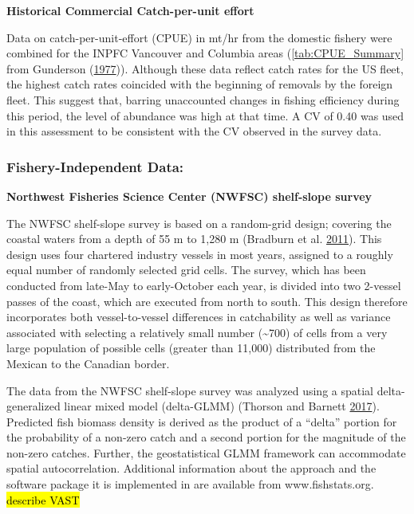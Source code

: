 \documentclass[12pt,]{article}
\begin{document}
\textbf{Historical Commercial Catch-per-unit effort}

Data on catch-per-unit-effort (CPUE) in mt/hr from the domestic fishery
were combined for the INPFC Vancouver and Columbia areas
(\ref{tab:CPUE_Summary} from Gunderson
(\protect\hyperlink{ref-gunderson_population_1977}{1977})). Although
these data reflect catch rates for the US fleet, the highest catch rates
coincided with the beginning of removals by the foreign fleet. This
suggest that, barring unaccounted changes in fishing efficiency during
this period, the level of abundance was high at that time. A CV of 0.40
was used in this assessment to be consistent with the CV observed in the
survey data.

\subsubsection{Fishery-Independent
Data:}\label{fishery-independent-data}

\textbf{Northwest Fisheries Science Center (NWFSC) shelf-slope survey}

The NWFSC shelf-slope survey is based on a random-grid design; covering
the coastal waters from a depth of 55 m to 1,280 m (Bradburn et al.
\protect\hyperlink{ref-bradburn_2003_2011}{2011}). This design uses four
chartered industry vessels in most years, assigned to a roughly equal
number of randomly selected grid cells. The survey, which has been
conducted from late-May to early-October each year, is divided into two
2-vessel passes of the coast, which are executed from north to south.
This design therefore incorporates both vessel-to-vessel differences in
catchability as well as variance associated with selecting a relatively
small number (\textasciitilde{}700) of cells from a very large
population of possible cells (greater than 11,000) distributed from the
Mexican to the Canadian border.

The data from the NWFSC shelf-slope survey was analyzed using a spatial
delta-generalized linear mixed model (delta-GLMM) (Thorson and Barnett
\protect\hyperlink{ref-thorson_comparing_2017}{2017}). Predicted fish
biomass density is derived as the product of a ``delta'' portion for the
probability of a non-zero catch and a second portion for the magnitude
of the non-zero catches. Further, the geostatistical GLMM framework can
accommodate spatial autocorrelation. Additional information about the
approach and the software package it is implemented in are available
from www.fishstats.org. \hl{describe VAST}
\end{document}
